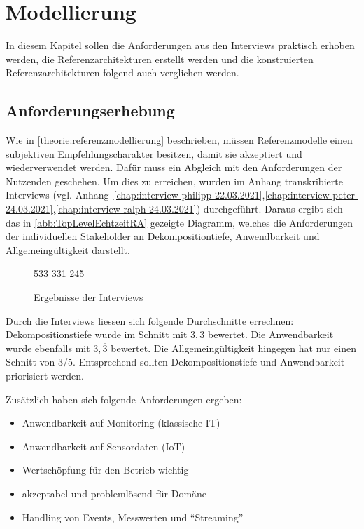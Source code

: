 \chapter{Modellierung}
In diesem Kapitel sollen die Anforderungen aus den Interviews praktisch erhoben werden, die Referenzarchitekturen erstellt werden und die konstruierten Referenzarchitekturen folgend auch verglichen werden.
\section{Anforderungserhebung}
Wie in \autoref{theorie:referenzmodellierung} beschrieben, müssen Referenzmodelle einen subjektiven Empfehlungscharakter besitzen, damit sie akzeptiert und wiederverwendet werden. Dafür muss ein Abgleich mit den Anforderungen der Nutzenden geschehen. Um dies zu erreichen, wurden im Anhang transkribierte Interviews (vgl. Anhang~\ref{chap:interview-philipp-22.03.2021},\ref{chap:interview-peter-24.03.2021},\ref{chap:interview-ralph-24.03.2021}) durchgeführt. Daraus ergibt sich das in \autoref{abb:TopLevelEchtzeitRA} gezeigte Diagramm, welches die Anforderungen der individuellen Stakeholder an Dekompositiontiefe, Anwendbarkeit und Allgemeingültigkeit darstellt.

\begin{figure}[H]
\centering
\spideroverview
{5}{3}{3}
{3}{3}{1}
{2}{4}{5}
\caption{Ergebnisse der Interviews}
\label{abb:DimensionenUebersicht}
\end{figure}
Durch die Interviews liessen sich folgende Durchschnitte errechnen: Dekompositionstiefe wurde im Schnitt mit $3,\overline{3}$ bewertet. Die Anwendbarkeit wurde ebenfalls mit $3,\overline{3}$ bewertet. Die Allgemeingültigkeit hingegen hat nur einen Schnitt von $3$/5. Entsprechend sollten Dekompositionstiefe und Anwendbarkeit priorisiert werden.

Zusätzlich haben sich folgende Anforderungen ergeben:
\begin{itemize}
\item Anwendbarkeit auf Monitoring (klassische IT)
\item Anwendbarkeit auf Sensordaten (\ac{IoT})
\item Wertschöpfung für den Betrieb wichtig
\item akzeptabel und problemlösend für Domäne
\item Handling von Events, Messwerten und \enquote{Streaming}
\end{itemize}

